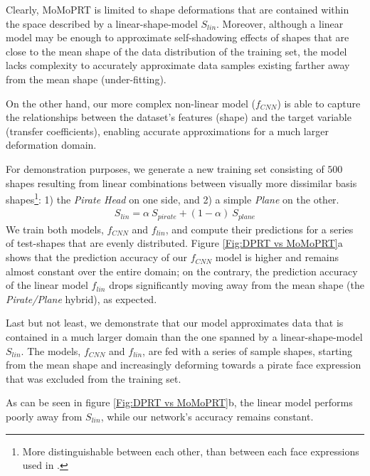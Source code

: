 Clearly, MoMoPRT is limited to shape deformations that are contained within the space described by a linear-shape-model $S_{lin}$. Moreover, although a linear model may be enough to approximate self-shadowing effects of shapes that are close to the mean shape of the data distribution of the training set, the model lacks complexity to accurately approximate data samples existing farther away from the mean shape (under-fitting).  

On the other hand, our more complex non-linear model ($f_{CNN}$) is able to capture the relationships between the dataset's features (shape) and the target variable (transfer coefficients), enabling accurate approximations for a much larger deformation domain.

For demonstration purposes, we generate a new training set consisting of $500$ shapes resulting from linear combinations between visually more dissimilar basis shapes\footnote{More distinguishable between each other, than between each face expressions used in \cite{MoMo}.}: 1) the \textit{Pirate Head } on one side, and 2)  a simple \textit{Plane} on the other. 
\begin{align*}
S_{lin} = \alpha ~ S_{pirate} + (1 - \alpha)~S_{plane}
\end{align*}
We train both models, $f_{CNN}$ and $f_{lin}$, and compute their predictions for a series of test-shapes that are evenly distributed. Figure \ref{Fig:DPRT vs MoMoPRT}a shows that the prediction accuracy of our $f_{CNN}$ model is higher and remains almost constant over the entire domain; on the contrary, the prediction accuracy of the linear model $f_{lin}$ drops significantly moving away from the mean shape (the \textit{Pirate/Plane} hybrid), as expected. 


Last but not least, we demonstrate that our model approximates data that is contained in a much larger domain than the one spanned by a linear-shape-model $S_{lin}$. The models, $f_{CNN}$ and $f_{lin}$, are fed with a series of sample shapes, starting from the mean shape and increasingly deforming towards a pirate face expression that was excluded from the training set. 

As can be seen in figure \ref{Fig:DPRT vs MoMoPRT}b, the linear model performs poorly away from $S_{lin}$, while our network's accuracy remains constant.


